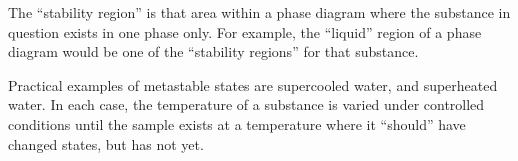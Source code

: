 \vskip 10pt

The ``stability region'' is that area within a phase diagram where the substance in question exists in one phase only.  For example, the ``liquid'' region of a phase diagram would be one of the ``stability regions'' for that substance.

\vskip 10pt

Practical examples of metastable states are supercooled water, and superheated water.  In each case, the temperature of a substance is varied under controlled conditions until the sample exists at a temperature where it ``should'' have changed states, but has not yet.











